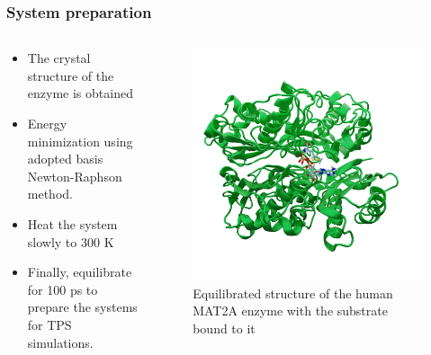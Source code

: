 \documentclass{beamer}
\begin{document}
\begin{frame}
\frametitle{System preparation}
\begin{columns}
\begin{column}{0.5\textwidth}
\begin{itemize}
\item The crystal structure of the enzyme is obtained

\item Energy minimization using adopted basis Newton-Raphson method. 

\item Heat the system slowly to 300 K 

\item Finally, equilibrate for 100 ps 
to prepare the systems for TPS simulations. 
\end{itemize}
\end{column}
\begin{column}{0.5\textwidth}  %
\begin{figure}
\centering 
\includegraphics[scale=0.15]{figures/mat2a-equil.png}
\caption{Equilibrated structure of the human MAT2A enzyme with the substrate bound to it}
\end{figure}
\end{column}
\end{columns}
\end{frame}
\end{document}
